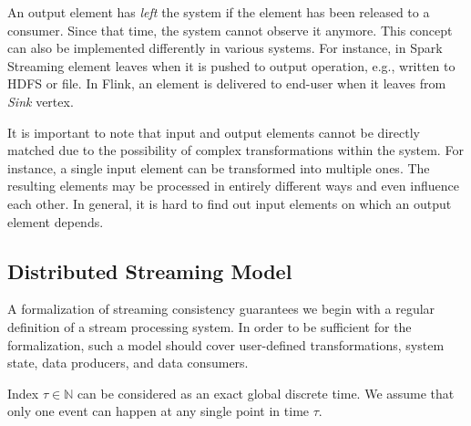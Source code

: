 An output element has {\em left} the system if the element has been released to a consumer. 
Since that time, the system cannot observe it anymore. This concept can also be implemented differently in various systems. For instance, in Spark Streaming element leaves when it is pushed to output operation, e.g., written to HDFS or file. In Flink, an element is delivered to end-user when it leaves from {\em Sink} vertex.   

It is important to note that input and output elements cannot be directly matched due to the possibility of complex transformations within the system. 
For instance, a single input element can be transformed into multiple ones.  The resulting elements may be processed in entirely different ways and even influence each other. 
In general, it is hard to find out input elements on which an output element depends. 

\subsection{Distributed Streaming Model}

A formalization of streaming consistency guarantees we begin with a regular definition of a stream processing system. In order to be sufficient for the formalization, such a model should cover user-defined transformations, system state, data producers, and data consumers.

Index $\tau\in{\mathbb{N}}$ can be considered as an exact global discrete time. We assume that only one event can happen at any single point in time $\tau$.

